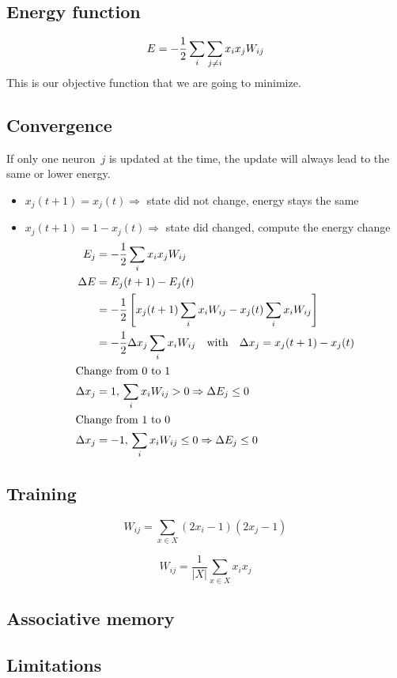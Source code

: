 \subsection{Energy function}
\begin{equation}
E = -\frac{1}{2} \sum_i \sum_{j\neq i} x_i x_j W_{ij}
\end{equation}
This is our objective function that we are going to minimize.

\subsection{Convergence}
If only one neuron~$j$ is updated at the time, the update will always lead to the same or lower energy.
\begin{itemize}
\item $x_j(t+1) = x_j(t) \Rightarrow$ state did not change, energy stays the same
\item $x_j(t+1) = 1 - x_j(t) \Rightarrow$ state did changed, compute the energy change
	\begin{align}
	E_j &= -\frac{1}{2} \sum_i x_i x_j W_{ij}\\
	\Delta E &= E_j(t+1) - E_j(t)\\
	&= -\frac{1}{2} \left[ x_j(t+1) \sum_i x_i W_{ij} - x_j(t) \sum_i x_i W_{ij} \right]\\
	&= -\frac{1}{2} \Delta x_j \sum_i x_i W_{ij}\quad\text{with}\quad	\Delta x_j = x_j(t+1) - x_j(t)\\
	\intertext{Change from 0 to 1}
	\Delta x_j &= 1,\,\sum_i x_i W_{ij} > 0 \Rightarrow \Delta E_j \leq 0\\
	\intertext{Change from 1 to 0}
	\Delta x_j &= -1,\,\sum_i x_i W_{ij} \leq 0 \Rightarrow \Delta E_j \leq 0
	\end{align}
\end{itemize}

\subsection{Training}
\begin{equation}
W_{ij} = \sum_{x \in X} (2x_i -1)(2x_j-1)
\end{equation}

\begin{equation}
W_{ij} = \frac{1}{|X|} \sum_{x \in X} x_i x_j
\end{equation}

\subsection{Associative memory}

\subsection{Limitations}
